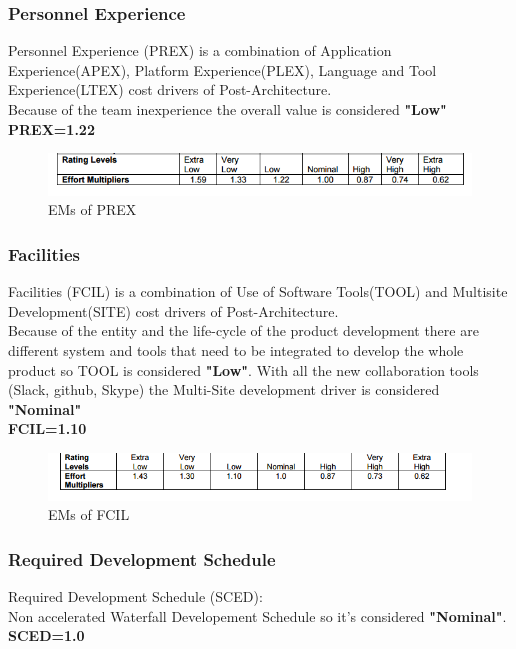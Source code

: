 \subsubsection{Personnel Experience}		
{Personnel Experience (PREX) is a combination of Application Experience(APEX), Platform Experience(PLEX), Language and Tool Experience(LTEX) cost drivers of Post-Architecture. 
			\\
			Because of the team inexperience the overall value is considered \textbf{"Low" }
			\\
			\textbf{PREX=1.22}
		\begin{figure}[H] 
			\centering
			\includegraphics[scale = 0.6]{img/PREX.png}
			\caption{EMs of PREX}
		\end{figure}

\subsubsection{Facilities }		
Facilities (FCIL) is a combination of Use of Software Tools(TOOL) and Multisite Development(SITE) cost drivers of Post-Architecture. 
		\\
		Because of the entity and the life-cycle of the product development there are different system and tools that need to be integrated to develop the whole product so TOOL is considered \textbf{"Low"}.
		With all the new collaboration tools (Slack, github, Skype) the Multi-Site development driver is considered \textbf{"Nominal"}
		\\
		\textbf{FCIL=1.10}
		\begin{figure}[H] 
			\centering
			\includegraphics[scale = 0.6]{img/FCIL.png}
			\caption{EMs of FCIL}
		\end{figure}

\subsubsection{Required Development Schedule }		
	Required Development Schedule (SCED):
		\\
		Non accelerated Waterfall Developement Schedule so it's considered \textbf{"Nominal"}.
		\\
		\textbf{SCED=1.0}
		
}
